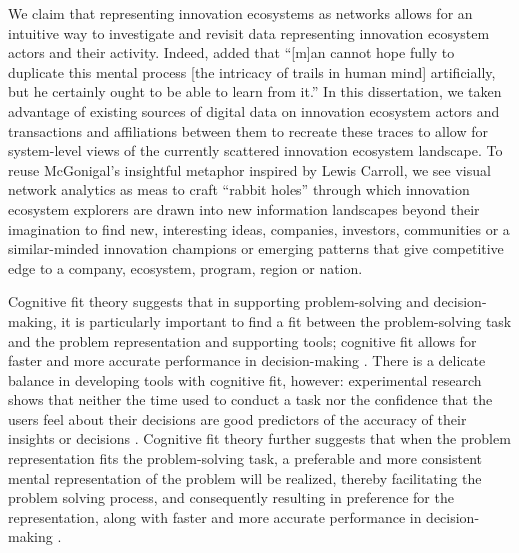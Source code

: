 We claim that representing innovation ecosystems as networks allows for an intuitive way to investigate and revisit data representing innovation ecosystem actors and their activity. Indeed, \cite{Bush1945AsThink} added that ``[m]an cannot hope fully to duplicate this mental process [the intricacy of trails in human mind] artificially, but he certainly ought to be able to learn from it.'' In this dissertation, we taken advantage of existing sources of digital data on innovation ecosystem actors and transactions and affiliations between them to recreate these traces to allow for system-level views of the currently scattered innovation ecosystem landscape. To reuse McGonigal’s \citeyearpar{McGonigal2005} insightful metaphor inspired by Lewis Carroll, we see visual network analytics as meas to craft ``rabbit holes'' through which innovation ecosystem explorers are drawn into new information landscapes beyond their imagination to find new, interesting ideas, companies, investors, communities or a similar-minded innovation champions \citep[cf.][]{Huhtamaki2007CommunityEcosystem} or emerging patterns that give competitive edge to a company, ecosystem, program, region or nation.

Cognitive fit theory suggests that in supporting problem-solving and decision-making, it is particularly important to find a fit between the problem-solving task and the problem representation and supporting tools; cognitive fit allows for faster and more accurate performance in decision-making \citep{Vessey1991}. There is a delicate balance in developing tools with cognitive fit, however: experimental research shows that neither the time used to conduct a task nor the confidence that the users feel about their decisions are good predictors of the accuracy of their insights or decisions \citep[cf.][]{Dunn2001}. Cognitive fit theory further suggests that when the problem representation fits the problem-solving task, a preferable and more consistent mental representation of the problem will be realized, thereby facilitating the problem solving process, and consequently resulting in preference for the representation, along with faster and more accurate performance in decision-making \citep{Basole2016EnablingAnalysis}.

